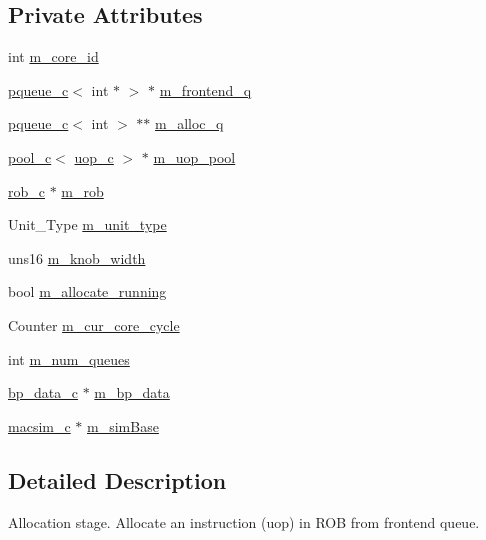\subsection*{Private Attributes}
\begin{DoxyCompactItemize}
\item 
int \hyperlink{classallocate__c_a15027f8e994b1f1a92ced957c0e0d3a0}{m\_\-core\_\-id}
\item 
\hyperlink{classpqueue__c}{pqueue\_\-c}$<$ int $\ast$ $>$ $\ast$ \hyperlink{classallocate__c_aff86488af7f8c8c0b95362604f0bf2dd}{m\_\-frontend\_\-q}
\item 
\hyperlink{classpqueue__c}{pqueue\_\-c}$<$ int $>$ $\ast$$\ast$ \hyperlink{classallocate__c_a39e15f51ece384c7db2d3225d57e2d74}{m\_\-alloc\_\-q}
\item 
\hyperlink{classpool__c}{pool\_\-c}$<$ \hyperlink{classuop__c}{uop\_\-c} $>$ $\ast$ \hyperlink{classallocate__c_ae224c68abb9e44d0e49c9733bc40a3c4}{m\_\-uop\_\-pool}
\item 
\hyperlink{classrob__c}{rob\_\-c} $\ast$ \hyperlink{classallocate__c_a0fee2d1b2259dc490cc23073818392e6}{m\_\-rob}
\item 
Unit\_\-Type \hyperlink{classallocate__c_a12688d33e58ab73cac49bb5cb01b9dbb}{m\_\-unit\_\-type}
\item 
uns16 \hyperlink{classallocate__c_ab40f52d71ffb1e048285b43d8c6c7ac7}{m\_\-knob\_\-width}
\item 
bool \hyperlink{classallocate__c_a263d672e86ddc35adf16aa139c762210}{m\_\-allocate\_\-running}
\item 
Counter \hyperlink{classallocate__c_af3cea72a28891dbd8f73705382225902}{m\_\-cur\_\-core\_\-cycle}
\item 
int \hyperlink{classallocate__c_adae0a88e65e155bda9ab14a7d5e31407}{m\_\-num\_\-queues}
\item 
\hyperlink{classbp__data__c}{bp\_\-data\_\-c} $\ast$ \hyperlink{classallocate__c_a2565b35de756da5bec94b3a533593097}{m\_\-bp\_\-data}
\item 
\hyperlink{classmacsim__c}{macsim\_\-c} $\ast$ \hyperlink{classallocate__c_ab503a0bd98d849f9904c62951f1574f2}{m\_\-simBase}
\end{DoxyCompactItemize}


\subsection{Detailed Description}
Allocation stage. Allocate an instruction (uop) in ROB from frontend queue. 

